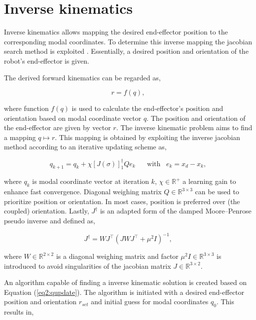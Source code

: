\section{Inverse kinematics}
\label{app:chap2}
Inverse kinematics allows mapping the desired end-effector position to the corresponding modal coordinates. To determine this inverse mapping the jacobian search method is exploited \cite{JacobianInverse}. Essentially, a desired position and orientation of the robot's end-effector is given. 

The derived forward kinematics can be regarded as,

\begin{equation}
    r = f(q),
\end{equation}

where function $f(q)$ is used to calculate the end-effector's position and orientation based on modal coordinate vector $q$. The position and orientation of the end-effector are given by vector $r$. The inverse kinematic problem aims to find a mapping $q\mapsto r$. This mapping is obtained by exploiting the inverse jacobian method according to an iterative updating scheme as,

\begin{equation}
    q_{k+1} = q_k + \chi [J(\sigma)]_1^\dagger Q e_k \hspace{20pt} \text{with} \hspace{10pt}  e_k = x_d - x_k,
    \label{eq2:qupdate}
\end{equation}

where $q_k$ is modal coordinate vector at iteration $k$, $\chi \in \mathbb{R}^+$ a learning gain to enhance fast convergence. Diagonal weighing matrix $Q \in \mathbb{R}^{3\times 3}$ can be used to prioritize position or orientation. In most cases, position is preferred over (the coupled) orientation. Lastly, $J^\dagger$ is an adapted form of the damped Moore–Penrose pseudo inverse and defined as,

\begin{equation}
    J^\dagger = WJ^\top(JWJ^\top + \mu^2 I)^{-1}
    \label{eq2:pseudoinverse},
\end{equation}

where $W \in \mathbb{R}^{2\times 2}$ is a diagonal weighing matrix and factor $\mu^2 I \in \mathbb{R}^{3 \times 3}$ is introduced to avoid singularities of the jacobian matrix $J \in \mathbb{R}^{3 \times 2}$. 

An algorithm capable of finding a inverse kinematic solution is created based on Equation (\ref{eq2:qupdate}). The algorithm is initiated with a desired end-effector position and orientation $r_{set}$ and initial guess for modal coordinates $q_0$. This results in,


